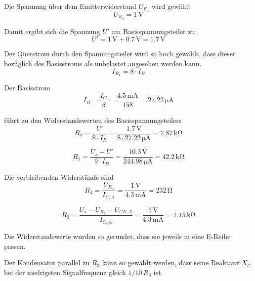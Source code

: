 Die Spannung über dem Emitterwiderstand $U_{R_4}$ wird gewählt
\[ U_{R_4} = 1 \, \si{\volt}\]

\noindent Damit ergibt sich die Spannung $U'$ am Basisspannungsteiler zu
\[ U' = 1 \, \si{\volt} + 0.7 \, \si{\volt} = 1.7 \, \si{\volt}\]

Der Querstrom durch den Spannungsteiler wird so hoch gewählt, dass dieser
bezüglich des Basisstroms als unbelastet angesehen werden kann. 
\[I_{R_1} = 8 \cdot I_B\]

\noindent Der Basisstrom
\[I_B = \frac{I_C}{\beta} = \frac{4.5 \, \si{\milli\ampere}}{158} = 27.22 \, \si{\micro\ampere}\]

\noindent führt zu den Widerstandswerten des Basisspannungsteilers
\[R_2 = \frac{U'}{8 \cdot I_B} = \frac{1.7 \, \si{\volt}}{8 \cdot 27.22 \,
    \si{\micro\ampere}} = 7.87 \, \si{\kilo\ohm}\]

\[R_1 = \frac{U_s - U'}{9 \cdot I_B} = \frac{10.3 \, \si{\volt}}{244.98 \,
    \si{\micro\ampere}} = 42.2 \, \si{\kilo\ohm}\]

Die verbleibenden Widerstände sind
\[ R_4 =  \frac{U_{R_4}}{I_{C,A}} = \frac{1 \, \si{\volt}}{4.3 \,
    \si{\milli\ampere}} = 232 \, \si{\ohm}\]

\[R_3 = \frac{U_s - U_{R_4} - U_{CE,A}}{I_{C,A}} = \frac{5 \, \si{\volt}}{4.3 \,
  \si{\milli\ampere}} = 1.15 \, \si{\kilo\ohm}\]

Die Widerstandswerte wurden so gerundet, dass sie jeweils in eine E-Reihe passen.

Der Kondensator parallel zu $R_3$ kann so gewählt werden, dass seine Reaktanz $X_C$ bei der
niedrigsten Signalfrequenz gleich $1/10\, R_3$ ist.